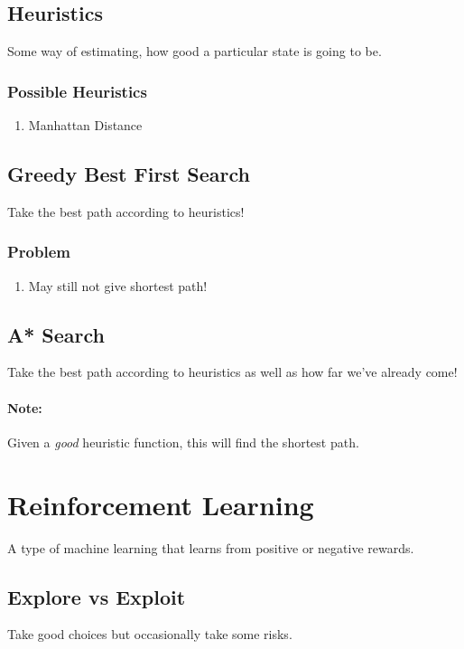 \subsection{Heuristics}
Some way of estimating, how good a particular state is going to be.

\subsubsection{Possible Heuristics}
\begin{enumerate}
	\item Manhattan Distance
\end{enumerate}

\subsection{Greedy Best First Search}
Take the best path according to heuristics!

\subsubsection{Problem}
\begin{enumerate}
	\item May still not give shortest path!
\end{enumerate}

\subsection{A* Search}
Take the best path according to heuristics as well as how far we've already come!

\paragraph{Note:} Given a \emph{good} heuristic function, this will find the shortest
path.

\section{Reinforcement Learning}
A type of machine learning that learns from positive or negative rewards.

\subsection{Explore vs Exploit}
Take good choices but occasionally take some risks.

